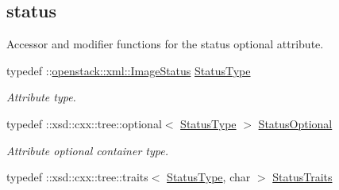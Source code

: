 \subsection*{status}
\label{_amgrp9acb44549b41563697bb490144ec6258}
Accessor and modifier functions for the status optional attribute. \begin{DoxyCompactItemize}
\item 
\hypertarget{classopenstack_1_1xml_1_1Image_adef42d785de51cb3f7e5da01b3b8fc96}{
typedef ::\hyperlink{classopenstack_1_1xml_1_1ImageStatus}{openstack::xml::ImageStatus} \hyperlink{classopenstack_1_1xml_1_1Image_adef42d785de51cb3f7e5da01b3b8fc96}{StatusType}}
\label{classopenstack_1_1xml_1_1Image_adef42d785de51cb3f7e5da01b3b8fc96}

\begin{DoxyCompactList}\small\item\em Attribute type. \item\end{DoxyCompactList}\item 
\hypertarget{classopenstack_1_1xml_1_1Image_ad54f9fe9aff91875b983bbc19e332b55}{
typedef ::xsd::cxx::tree::optional$<$ \hyperlink{classopenstack_1_1xml_1_1ImageStatus}{StatusType} $>$ \hyperlink{classopenstack_1_1xml_1_1Image_ad54f9fe9aff91875b983bbc19e332b55}{StatusOptional}}
\label{classopenstack_1_1xml_1_1Image_ad54f9fe9aff91875b983bbc19e332b55}

\begin{DoxyCompactList}\small\item\em Attribute optional container type. \item\end{DoxyCompactList}\item 
\hypertarget{classopenstack_1_1xml_1_1Image_aac581b42e8ef09131a317fa7ba050447}{
typedef ::xsd::cxx::tree::traits$<$ \hyperlink{classopenstack_1_1xml_1_1ImageStatus}{StatusType}, char $>$ \hyperlink{classopenstack_1_1xml_1_1Image_aac581b42e8ef09131a317fa7ba050447}{StatusTraits}}
\label{classopenstack_1_1xml_1_1Image_aac581b42e8ef09131a317fa7ba050447}


\end{DoxyCompactItemize}
